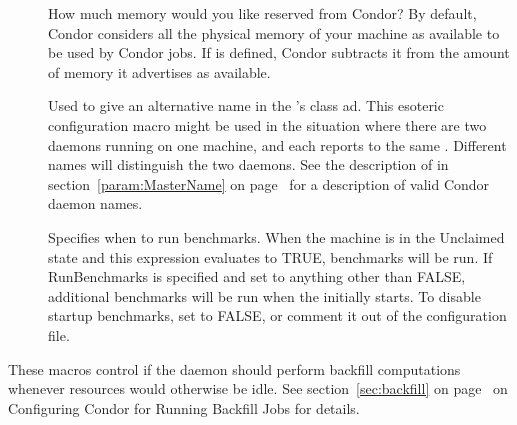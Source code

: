 \begin{description}
\item[] \label{param:ReservedMemory}
  How much memory would you like reserved from Condor?  By default,
  Condor considers all the physical memory of your machine as
  available to be used by Condor jobs.  If  is
  defined, Condor subtracts it from the amount of memory it advertises
  as available.

\item[] \label{param:StartdName}
  Used to give an alternative name in the 's
  class ad.
  This esoteric configuration macro might be used in the situation
  where there are two  daemons running on one machine,
  and each reports to the same .
  Different names will distinguish the two daemons.
  See the description of  in
  section~\ref{param:MasterName} on page~\pageref{param:MasterName}
  for a description of valid Condor daemon names.

\item[] \label{param:RunBenchmarks}
  Specifies when to run benchmarks.
  When the machine is in the Unclaimed state and this expression
  evaluates to TRUE, benchmarks will be run.
  If RunBenchmarks is specified and set to anything other than FALSE,
  additional benchmarks will be run when the  initially starts.
  To disable startup benchmarks, set  to FALSE,
  or comment it out of the configuration file.

\end{description}

These macros control if the  daemon should perform
backfill computations whenever resources would otherwise be idle.  
See section~\ref{sec:backfill} on page~\pageref{sec:backfill} on
Configuring Condor for Running Backfill Jobs for details.

